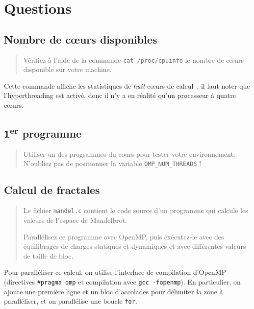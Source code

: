 
\lstset{%
  basicstyle=\footnotesize,
}%

\section{Questions}

\subsection{Nombre de cœurs disponibles}

\begin{quotation}
  Vérifiez à l'aide de la commande \texttt{cat /proc/cpuinfo} le
  nombre de cœurs disponible sur votre machine.
\end{quotation}

Cette commande affiche les statistiques de \emph{huit} cœurs de
calcul~; il faut noter que l'hyperthreading est activé, donc il n'y a
en réalité qu'un processeur à quatre cœurs.

\subsection[Premier programme]{1\textsuperscript{er} programme}

\begin{quotation}
  Utiliser un des programmes du cours pour tester votre
  environnement. N'oubliez pas de positionner la variable
  \texttt{OMP\_NUM\_THREADS} !
\end{quotation}

\subsection{Calcul de fractales}

\begin{quotation}
  Le fichier \texttt{mandel.c} contient le code source d'un programme
  qui calcule les valeurs de l'espace de Mandelbrot.

  Parallélisez ce programme avec OpenMP, puis exécutez-le avec des
  équilibrages de charges statiques et dynamiques et avec différentes
  valeurs de taille de bloc.
\end{quotation}

Pour paralléliser ce calcul, on utilise l'interface de compilation
d'OpenMP (directives \texttt{\#pragma omp} et compilation avec
\texttt{gcc -fopenmp}). En particulier, on ajoute une première ligne
et un bloc d'accolades pour délimiter la zone à paralléliser, et on
parallélise une boucle \texttt{for}.

